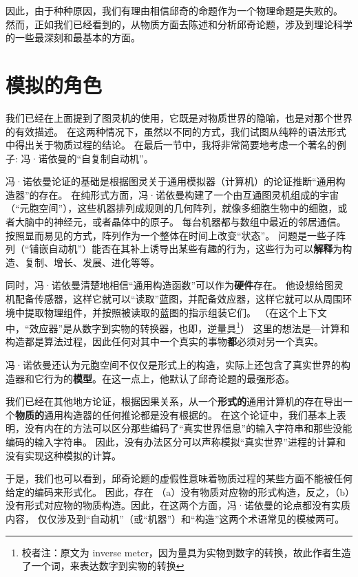 \documentclass[a4paper,12pt]{article}
\begin{document}
因此，由于种种原因，我们有理由相信邱奇的命题作为一个物理命题是失败的。
然而，正如我们已经看到的，从物质方面去陈述和分析邱奇论题，涉及到理论科学的一些最深刻和最基本的方面。

\section{模拟的角色}

我们已经在上面提到了图灵机的使用，它既是对物质世界的隐喻，也是对那个世界的有效描述。
在这两种情况下，虽然以不同的方式，我们试图从纯粹的语法形式中得出关于物质过程的结论。
在最后一节中，我将非常简要地考虑一个著名的例子: 冯·诺依曼的“自复制自动机”\cite{BurksA1966}\cite{ArbibMA1988}。

冯·诺依曼论证的基础是根据图灵关于通用模拟器（计算机）的论证推断“通用构造器”的存在。
在纯形式方面，冯·诺依曼构建了一个由互通图灵机组成的宇宙（“元胞空间”），这些机器排列成规则的几何阵列，就像多细胞生物中的细胞，或者大脑中的神经元，或者晶体中的原子。
每台机器都与数组中最近的邻居通信。按照显而易见的方式，阵列作为一个整体在时间上改变“状态”。
问题是一些子阵列（“铺嵌自动机”）能否在其补上诱导出某些有趣的行为，这些行为可以\textbf{解释}为构造、复制、增长、发展、进化等等。

同时，冯·诺依曼清楚地相信“通用构造函数”可以作为\textbf{硬件}存在。
他设想给图灵机配备传感器，这样它就可以“读取”蓝图，并配备效应器，这样它就可以从周围环境中提取物理组件，并按照被读取的蓝图的指示组装它们。
（在这个上下文中，“效应器”是从数字到实物的转换器，也即，逆量具\footnote[1]{校者注：原文为 inverse meter，因为量具为实物到数字的转换，故此作者生造了一个词，来表达数字到实物的转换}）
这里的想法是—计算和构造都是算法过程，因此任何对其中一个真实的事物\textbf{都}必须对另一个真实。

冯·诺依曼还认为元胞空间不仅仅是形式上的构造，实际上还包含了真实世界的构造器和它行为的\textbf{模型}。在这一点上，他默认了邱奇论题的最强形态。

我们已经在其他地方\cite{RosenR1985}论证，根据因果关系，从一个\textbf{形式的}通用计算机的存在导出一个\textbf{物质的}通用构造器的任何推论都是没有根据的。
在这个论证中，我们基本上表明，没有内在的方法可以区分那些编码了“真实世界信息”的输入字符串和那些没能编码的输入字符串。
因此，没有办法区分可以声称模拟“真实世界”进程的计算和没有实现这种模拟的计算。

于是，我们也可以看到，邱奇论题的虚假性意味着物质过程的某些方面不能被任何给定的编码来形式化。
因此，存在 （a）没有物质对应物的形式构造，反之，（b）没有形式对应物的物质构造。因此，在这两个方面，冯·诺依曼的论点都没有实质内容，
仅仅涉及到“自动机”（或“机器”）和“构造”这两个术语常见的模棱两可。
\end{document}
